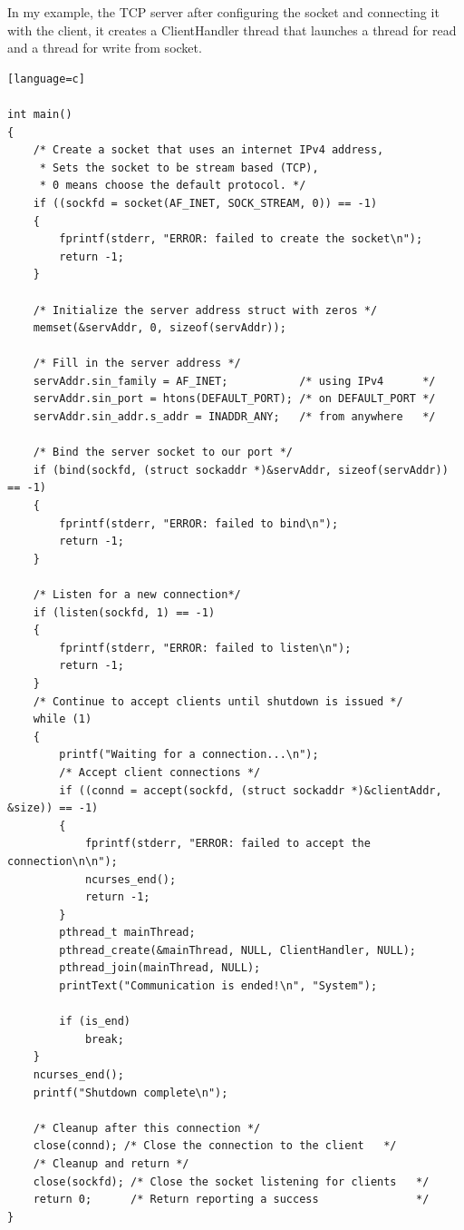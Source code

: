 \documentclass[a4paper,12pt]{report}
\begin{document}
In my example, the TCP server after configuring the socket and connecting it with the client, it creates a ClientHandler thread that launches a thread for read and a thread for write from socket.
\begin{lstlisting}[caption={int main() of TCP server},captionpos=b][language=c]

int main()
{
    /* Create a socket that uses an internet IPv4 address,
     * Sets the socket to be stream based (TCP),
     * 0 means choose the default protocol. */
    if ((sockfd = socket(AF_INET, SOCK_STREAM, 0)) == -1)
    {
        fprintf(stderr, "ERROR: failed to create the socket\n");
        return -1;
    }

    /* Initialize the server address struct with zeros */
    memset(&servAddr, 0, sizeof(servAddr));

    /* Fill in the server address */
    servAddr.sin_family = AF_INET;           /* using IPv4      */
    servAddr.sin_port = htons(DEFAULT_PORT); /* on DEFAULT_PORT */
    servAddr.sin_addr.s_addr = INADDR_ANY;   /* from anywhere   */

    /* Bind the server socket to our port */
    if (bind(sockfd, (struct sockaddr *)&servAddr, sizeof(servAddr)) == -1)
    {
        fprintf(stderr, "ERROR: failed to bind\n");
        return -1;
    }

    /* Listen for a new connection*/
    if (listen(sockfd, 1) == -1)
    {
        fprintf(stderr, "ERROR: failed to listen\n");
        return -1;
    }
    /* Continue to accept clients until shutdown is issued */
    while (1)
    {
        printf("Waiting for a connection...\n");
        /* Accept client connections */
        if ((connd = accept(sockfd, (struct sockaddr *)&clientAddr, &size)) == -1)
        {
            fprintf(stderr, "ERROR: failed to accept the connection\n\n");
            ncurses_end();
            return -1;
        }
        pthread_t mainThread;
        pthread_create(&mainThread, NULL, ClientHandler, NULL);
        pthread_join(mainThread, NULL);
        printText("Communication is ended!\n", "System");

        if (is_end)
            break;
    }
    ncurses_end();
    printf("Shutdown complete\n");

    /* Cleanup after this connection */
    close(connd); /* Close the connection to the client   */
    /* Cleanup and return */
    close(sockfd); /* Close the socket listening for clients   */
    return 0;      /* Return reporting a success               */
}

\end{lstlisting}
\end{document}
